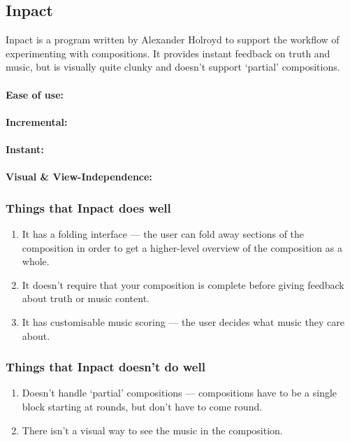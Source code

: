 \documentclass[12pt]{article}
\begin{document}
\subsection{Inpact}

Inpact is a program written by Alexander Holroyd to support the workflow of experimenting with
compositions.  It provides instant feedback on truth and music, but is visually quite clunky and
doesn't support `partial' compositions.

\paragraph{Ease of use:}

\paragraph{Incremental:}

\paragraph{Instant:}

\paragraph{Visual \& View-Independence:}

\subsubsection{Things that Inpact does well}

\begin{enumerate}
    \item It has a folding interface --- the user can fold away sections of the composition in order
        to get a higher-level overview of the composition as a whole.
    \item It doesn't require that your composition is complete before giving feedback about truth or
        music content.
    \item It has customisable music scoring --- the user decides what music they care about.
\end{enumerate}

\subsubsection{Things that Inpact doesn't do well}

\begin{enumerate}
    \item Doesn't handle `partial' compositions --- compositions have to be a single block starting
        at rounds, but don't have to come round.
    \item There isn't a visual way to see the music in the composition.
\end{enumerate}
\end{document}
